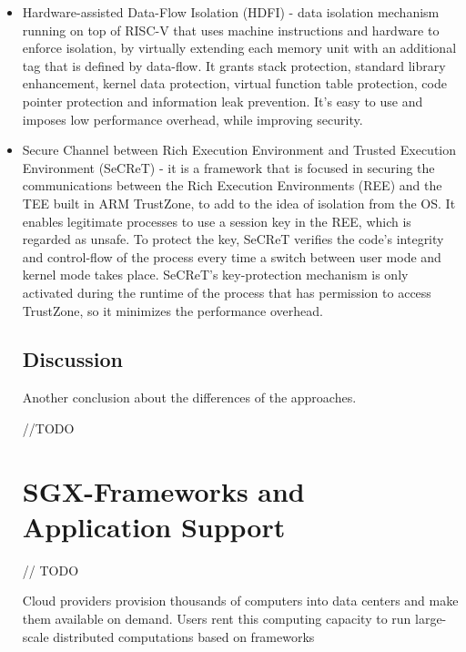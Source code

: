 \begin{itemize}
	\item Hardware-assisted Data-Flow Isolation (HDFI) \cite{hdmiPaper} - data isolation mechanism running on top of RISC-V that uses machine instructions and hardware to enforce isolation, by virtually extending each memory unit with an additional tag that is defined by data-flow. It grants stack protection, standard library enhancement, kernel data protection, virtual function table protection, code pointer protection and information leak prevention. It's easy to use and imposes low performance overhead, while improving security.
	
	\item Secure Channel between Rich Execution Environment and Trusted Execution Environment (SeCReT) \cite{secretPaper} - it is a framework that is focused in securing the communications between the Rich Execution Environments (REE) and the TEE built in ARM TrustZone, to add to the idea of isolation from the OS. It enables legitimate processes to use a session key in the REE, which is regarded as unsafe. To protect the key, SeCReT verifies the code's integrity and control-flow of the process every time a switch between user mode and kernel mode takes place. SeCReT's key-protection mechanism is only activated during the runtime of the process that has permission to access TrustZone, so it minimizes the performance overhead.
	




\subsection{Discussion}

Another conclusion about the differences of the approaches. 
 
//TODO








\section{SGX-Frameworks and Application Support} %
\label{sec:package_options}

// TODO 

Cloud providers provision thousands of computers into data
centers and make them available on demand. Users rent this
computing capacity to run large-scale distributed computations
based on frameworks


\end{itemize}

